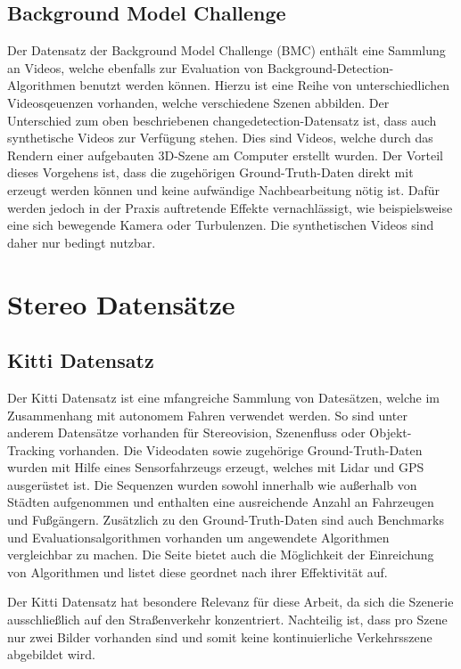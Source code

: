 \subsection*{Background Model Challenge}

Der Datensatz der Background Model Challenge (BMC) enth\"alt eine Sammlung an Videos, welche ebenfalls zur Evaluation von Background-Detection-Algorithmen benutzt werden k\"onnen. Hierzu ist eine Reihe von unterschiedlichen Videosqeuenzen vorhanden, welche verschiedene Szenen abbilden. Der Unterschied zum oben beschriebenen changedetection-Datensatz ist, dass auch synthetische Videos zur Verf\"ugung stehen. Dies sind Videos, welche durch das Rendern einer aufgebauten 3D-Szene am Computer erstellt wurden. Der Vorteil dieses Vorgehens ist, dass die zugeh\"origen Ground-Truth-Daten direkt mit erzeugt werden k\"onnen und keine aufw\"andige Nachbearbeitung n\"otig ist. Daf\"ur werden jedoch in der Praxis auftretende Effekte vernachl\"assigt, wie beispielsweise eine sich bewegende Kamera oder Turbulenzen. Die synthetischen Videos sind daher nur bedingt nutzbar.

\section{Stereo Datens\"atze}
\subsection*{Kitti Datensatz}


Der Kitti Datensatz ist eine mfangreiche Sammlung von Dates\"atzen, welche im Zusammenhang mit autonomem Fahren verwendet werden. So sind unter anderem Datens\"atze vorhanden f\"ur Stereovision, Szenenfluss oder Objekt-Tracking vorhanden. Die Videodaten sowie zugeh\"orige Ground-Truth-Daten wurden mit Hilfe eines Sensorfahrzeugs erzeugt, welches mit Lidar und GPS ausger\"ustet ist. Die Sequenzen wurden sowohl innerhalb wie au\ss{}erhalb von St\"adten aufgenommen und enthalten eine ausreichende Anzahl an Fahrzeugen und Fu\ss{}g\"angern. Zus\"atzlich zu den Ground-Truth-Daten sind auch Benchmarks und Evaluationsalgorithmen vorhanden um angewendete Algorithmen vergleichbar zu machen. Die Seite bietet auch die M\"oglichkeit der Einreichung von Algorithmen und listet diese geordnet nach ihrer Effektivit\"at auf.

Der Kitti Datensatz hat besondere Relevanz f\"ur diese Arbeit, da sich die Szenerie ausschlie\ss{}lich auf den Stra\ss{}enverkehr konzentriert. Nachteilig ist, dass pro Szene nur zwei Bilder vorhanden sind und somit keine kontinuierliche Verkehrsszene abgebildet wird. 

